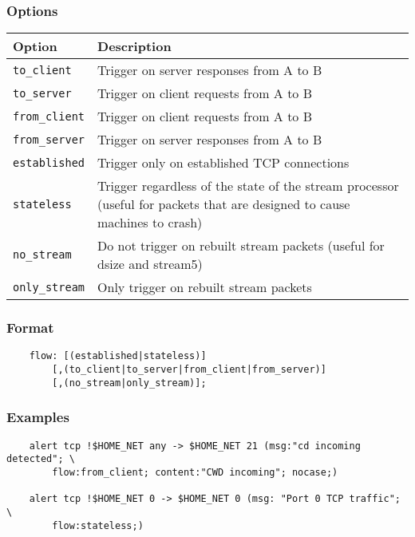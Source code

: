 \documentclass[english]{report}
\begin{document}
\subsubsection*{Options}

\begin{tabular}{| l | p{4.5in} |}
\hline
{\bf Option} & {\bf Description}\\
\hline
\hline
\texttt{to\_client} & Trigger on server responses from A to B\\
\hline
\texttt{to\_server} & Trigger on client requests from A to B\\
\hline
\texttt{from\_client} & Trigger on client requests from A to B\\
\hline
\texttt{from\_server} & Trigger on server responses from A to B\\
\hline
\texttt{established} & Trigger only on established TCP connections\\
\hline
\texttt{stateless} & Trigger regardless of the state of the stream processor
(useful for packets that are designed to cause machines to crash)\\
\hline
\texttt{no\_stream} & Do not trigger on rebuilt stream packets (useful 
for dsize and stream5)\\
\hline
\texttt{only\_stream} & Only trigger on rebuilt stream
packets\\
\hline
\end{tabular}

\subsubsection{Format}

\begin{verbatim}
    flow: [(established|stateless)] 
        [,(to_client|to_server|from_client|from_server)]
        [,(no_stream|only_stream)];
\end{verbatim}

\subsubsection{Examples}

\begin{verbatim}
    alert tcp !$HOME_NET any -> $HOME_NET 21 (msg:"cd incoming detected"; \
        flow:from_client; content:"CWD incoming"; nocase;)

    alert tcp !$HOME_NET 0 -> $HOME_NET 0 (msg: "Port 0 TCP traffic"; \
        flow:stateless;)
\end{verbatim}
\end{document}
